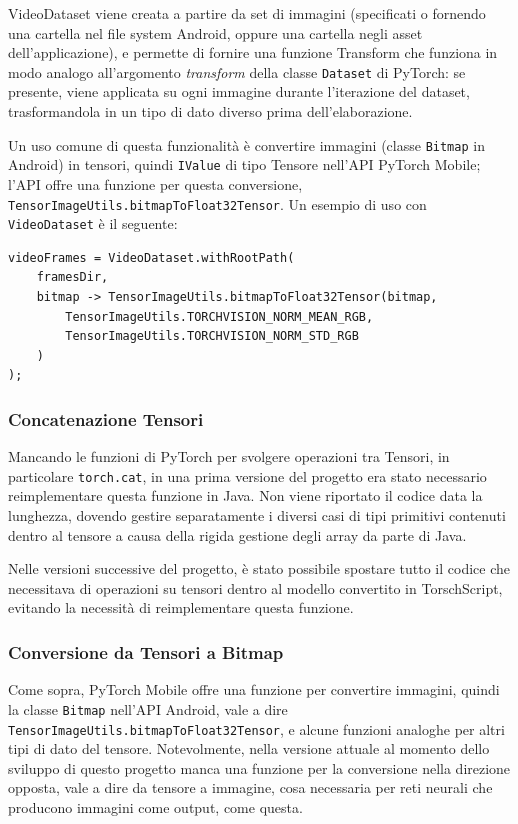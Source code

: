 VideoDataset viene creata a partire da set di immagini (specificati o fornendo una cartella
nel file system Android, oppure una cartella negli asset dell'applicazione), e permette di 
fornire una funzione Transform che funziona in modo analogo all'argomento \emph{transform}
della classe \texttt{Dataset} di PyTorch: se presente, viene applicata su ogni immagine
durante l'iterazione del dataset, trasformandola in un tipo di dato diverso prima 
dell'elaborazione. 

Un uso comune di questa funzionalità è convertire immagini (classe
\texttt{Bitmap} in Android) in tensori, quindi \texttt{IValue} di tipo Tensore nell'API
PyTorch Mobile; l'API offre una funzione per questa conversione, 
\texttt{TensorImageUtils.bitmapToFloat32Tensor}. Un esempio di uso con \texttt{VideoDataset} 
è il seguente:

\begin{lstlisting}
videoFrames = VideoDataset.withRootPath(
    framesDir, 
    bitmap -> TensorImageUtils.bitmapToFloat32Tensor(bitmap,
        TensorImageUtils.TORCHVISION_NORM_MEAN_RGB,
        TensorImageUtils.TORCHVISION_NORM_STD_RGB
    )
);
\end{lstlisting}

\subsubsection*{Concatenazione Tensori}

Mancando le funzioni di PyTorch per svolgere operazioni tra Tensori, in particolare
\texttt{torch.cat}, in una prima versione del progetto era stato necessario reimplementare
questa funzione in Java. Non viene riportato il codice data la lunghezza, dovendo gestire 
separatamente i diversi casi di tipi primitivi contenuti dentro al tensore a causa della rigida
gestione degli array da parte di Java.

Nelle versioni successive del progetto, è stato possibile spostare tutto il codice che
necessitava di operazioni su tensori dentro al modello convertito in TorschScript, evitando
la necessità di reimplementare questa funzione.

\subsubsection*{Conversione da Tensori a Bitmap}

Come sopra, PyTorch Mobile offre una funzione per convertire immagini, quindi la classe
\texttt{Bitmap} nell'API Android, vale a dire \texttt{TensorImageUtils.bitmapToFloat32Tensor},
e alcune funzioni analoghe per altri tipi di dato del tensore. Notevolmente, nella versione 
attuale al momento dello sviluppo di questo progetto manca una funzione per la conversione
nella direzione opposta, vale a dire da tensore a immagine, cosa necessaria per reti neurali
che producono immagini come output, come questa.

